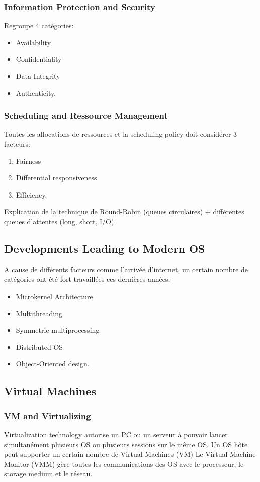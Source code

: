 \subsubsection{Information Protection and Security}
Regroupe 4 catégories:
\begin{itemize}
  \item Availability
  \item Confidentiality
  \item Data Integrity
  \item Authenticity.
\end{itemize}

\subsubsection{Scheduling and Ressource Management}
Toutes les allocations de ressources et la scheduling policy doit considérer 3 facteurs:
\begin{enumerate}
  \item Fairness
  \item Differential responsiveness
  \item Efficiency.
\end{enumerate}
Explication de la technique de Round-Robin (queues circulaires) + différentes queues d'attentes (long, short, I/O).

\subsection{Developments Leading to Modern OS}
A cause de différents facteurs comme l'arrivée d'internet, un certain nombre de catégories ont été fort travaillées ces dernières années:
\begin{itemize}
  \item Microkernel Architecture
  \item Multithreading
  \item Symmetric multiprocessing
  \item Distributed OS
  \item Object-Oriented design.
\end{itemize}

\subsection{Virtual Machines}

\subsubsection{VM and Virtualizing}
Virtualization technology autorise un PC ou un serveur à pouvoir lancer simultanément plusieurs OS ou plusieurs sessions sur le même OS.
Un OS hôte peut supporter un certain nombre de Virtual Machines (VM)
Le Virtual Machine Monitor (VMM) gère toutes les communications des OS avec le processeur, le storage medium et le réseau.


